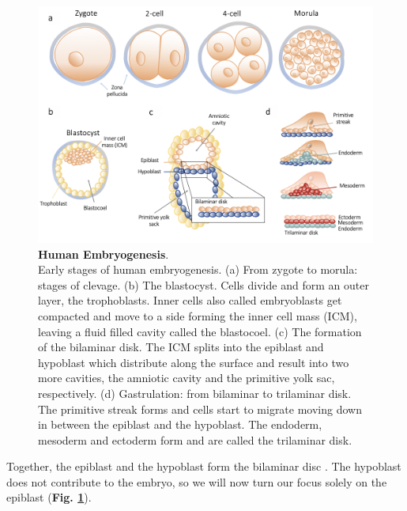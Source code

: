 \begin{figure}[h]
\centering
\includegraphics[width=14.5cm]{Chapter1/Fig/embryogenesis_til_gastrulation.png}
\caption[Human Embryogenesis]{\textbf{Human Embryogenesis}.\\
Early stages of human embryogenesis.
(a) From zygote to morula: stages of clevage.
(b) The blastocyst.
Cells divide and form an outer layer, the trophoblasts.
Inner cells also called embryoblasts get compacted and move to a side forming the inner cell mass (ICM), leaving a fluid filled cavity called the blastocoel.
(c) The formation of the bilaminar disk.
The ICM splits into the epiblast and hypoblast which distribute along the surface and result into two more cavities, the amniotic cavity and the primitive yolk sac, respectively.
(d) Gastrulation: from bilaminar to trilaminar disk.
The primitive streak forms and cells start to migrate moving down in between the epiblast and the hypoblast.
The endoderm, mesoderm and ectoderm form and are called the trilaminar disk.}
\label{fig:embryogenesis}
\end{figure}

Together, the epiblast and the hypoblast form the bilaminar disc \cite{hertig1956description}.
The hypoblast does not contribute to the embryo, so we will now turn our focus solely on the epiblast (\textbf{Fig. \ref{fig:embryogenesis}}).\\

